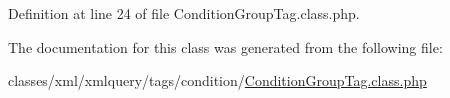 Definition at line 24 of file Condition\+Group\+Tag.\+class.\+php.



The documentation for this class was generated from the following file\+:\begin{DoxyCompactItemize}
\item 
classes/xml/xmlquery/tags/condition/\hyperlink{ConditionGroupTag_8class_8php}{Condition\+Group\+Tag.\+class.\+php}\end{DoxyCompactItemize}
